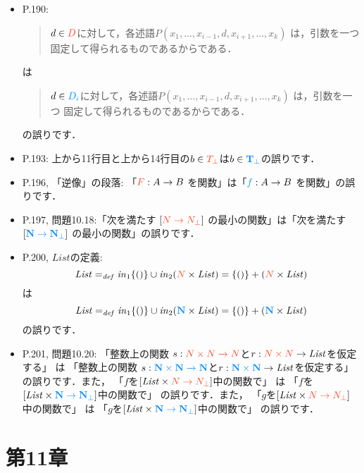 \documentclass[12pt,titlepage,twoside,openright,dvipdfmx]{jsbook}
\newcommand\old[1]{%
  \textcolor[rgb]{1.0,0.25,0.1}{#1}%
  }
\newcommand\new[1]{%
  \textcolor[rgb]{0,0.55,1.0}{#1}%
  }
\theoremstyle{definition}
\begin{document}
\begin{itemize}
\item P.190:
  \begin{quote}
    $d\in \old{D}$に対して，各述語$P(x_1,\ldots,x_{i-1},d,x_{i+1},\ldots,x_k)$ は，引数を一つ
    固定して得られるものであるから\inclusive{}である．
  \end{quote}
  は
  \begin{quote}
    $d\in \new{D_i}$に対して，各述語$P(x_1,\ldots,x_{i-1},d,x_{i+1},\ldots,x_k)$ は，引数を一つ
    固定して得られるものであるから\inclusive{}である．
  \end{quote}
  の誤りです．
\item P.193: 上から11行目と上から14行目の$b\in \old{T_\bot}$は$b\in \new{\mathbf{T}_\bot}$の誤りです．
\item P.196, 「逆像」の段落: 「$\old{F}:A\to B$ を関数」は「$\new{f}:A\to B$ を関数」の誤りです．
\item P.197, 問題10.18:「次を満たす $[\old{N\to N_\bot}]$ の最小の関数」は「次を満たす $[\new{\mathbf{N}\to \mathbf{N}_\bot}]$ の最小の関数」の誤りです．
\item P.200, $\mathit{List}$の定義:
  \[
    {\it List} =_{\mathit{def}} {\it in}_1\{()\} \cup {\it in}_2(\old{N}\times{\it List}) =
    \{()\} + (\old{N}\times{\it List})
  \]
  は
  \[
    {\it List} =_{\mathit{def}} {\it in}_1\{()\} \cup {\it in}_2(\new{\mathbf{N}}\times{\it List}) =
    \{()\} + (\new{\mathbf{N}}\times{\it List})
  \]
  の誤りです．
\item P.201, 問題10.20:
  「整数上の関数 $s:\old{N\times N\to N}$と$r:\old{N\times N}\to{\it List}$を仮定する」
  は
  「整数上の関数 $s:\new{\mathbf{N}\times \mathbf{N}\to \mathbf{N}}$と$r:\new{\mathbf{N}\times \mathbf{N}}\to{\it List}$を仮定する」
  の誤りです．また，
  「$f$を$[{\it List}\times \old{N\to N_\bot}]$中の関数で」
  は
  「$f$を$[{\it List}\times \new{\mathbf{N}\to \mathbf{N}_\bot}]$中の関数で」
  の誤りです．また，
  「$g$を$[{\it List}\times \old{N\to N_\bot}]$中の関数で」
  は
  「$g$を$[{\it List}\times \new{\mathbf{N}\to \mathbf{N}_\bot}]$中の関数で」
  の誤りです．
\end{itemize}

\section*{第11章}
\end{document}
